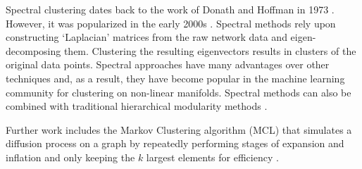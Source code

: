 \documentclass{report}
\begin{document}
	Spectral clustering dates back to the work of Donath and Hoffman in 1973 \cite{donath1973lower}. 
	However, it was popularized in the early 2000s \cite{ng2002spectral}. 
	Spectral methods rely upon constructing `Laplacian' matrices from the raw network data and eigen-decomposing them. 
	Clustering the resulting eigenvectors results in clusters of the original data points. 
	Spectral approaches have many advantages over other techniques and, as a result, they have become popular in the machine learning community for clustering  on non-linear manifolds. 
	Spectral methods can also be combined with traditional hierarchical modularity methods \cite{donetti2004detecting}.
	
	
	
	
	Further work includes the Markov Clustering algorithm (MCL) that simulates a diffusion process on a graph by repeatedly performing stages of expansion and inflation and only keeping the $k$ largest elements for efficiency \cite{van2001graph}. 
	
\end{document}
